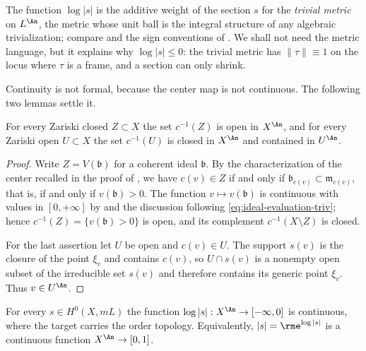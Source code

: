 The function $\log|s|$ is the additive weight of the section $s$ for the
\emph{trivial metric} on $L^{\An}$, the metric whose unit ball is the
integral structure of any algebraic trivialization; compare
 and the sign conventions of
.  We shall not need the metric language, but it
explains why $\log|s|\le0$: the trivial metric has $\|\tau\|\equiv1$ on
the locus where $\tau$ is a frame, and a section can only shrink.

Continuity is not formal, because the center map is not continuous.  The
following two lemmas settle it.

\begin{lemma}
\label{lem:ch34-center-anticontinuous}
For every Zariski closed $Z\subset X$ the set $c^{-1}(Z)$ is open in
$X^{\An}$, and for every Zariski open $U\subset X$ the set
$c^{-1}(U)$ is closed in $X^{\An}$ and contained in $U^{\An}$.
\end{lemma}

\begin{proof}
Write $Z=V(\mathfrak b)$ for a coherent ideal $\mathfrak b$.  By the
characterization of the center recalled in the proof of
, we have $c(v)\in Z$ if and only if
$\mathfrak b_{c(v)}\subset\mathfrak m_{c(v)}$, that is, if and only if
$v(\mathfrak b)>0$.  The function $v\mapsto v(\mathfrak b)$ is
continuous with values in $[0,+\infty]$ by
 and the discussion following
\eqref{eq:ideal-evaluation-triv}; hence
$c^{-1}(Z)=\{v(\mathfrak b)>0\}$ is open, and its complement
$c^{-1}(X\setminus Z)$ is closed.

For the last assertion let $U$ be open and $c(v)\in U$.  The support
$s(v)$ is the closure of the point $\xi_v$ and contains $c(v)$, so
$U\cap s(v)$ is a nonempty open subset of the irreducible set $s(v)$ and
therefore contains its generic point $\xi_v$.  Thus $v\in U^{\An}$.
\end{proof}

\begin{lemma}
\label{lem:ch34-log-s-continuous}
For every $s\in H^0(X,mL)$ the function
$\log|s|:X^{\An}\to[-\infty,0]$ is continuous, where the target carries
the order topology.  Equivalently, $|s|=\rme^{\log|s|}$ is a continuous
function $X^{\An}\to[0,1]$.
\end{lemma}

